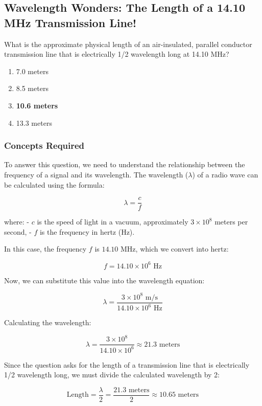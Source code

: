 \subsection{Wavelength Wonders: The Length of a 14.10 MHz Transmission Line!}

\begin{tcolorbox}[colback=gray!10, colframe=black, title=E9F06] What is the approximate physical length of an air-insulated, parallel conductor transmission line that is electrically 1/2 wavelength long at 14.10 MHz?

\begin{enumerate}[label=\Alph*.]
    \item 7.0 meters
    \item 8.5 meters
    \item \textbf{10.6 meters}
    \item 13.3 meters
\end{enumerate} \end{tcolorbox}

\subsubsection{Concepts Required}

To answer this question, we need to understand the relationship between the frequency of a signal and its wavelength. The wavelength (\(\lambda\)) of a radio wave can be calculated using the formula:

\[
\lambda = \frac{c}{f}
\]

where:
- \(c\) is the speed of light in a vacuum, approximately \(3 \times 10^8\) meters per second,
- \(f\) is the frequency in hertz (Hz).

In this case, the frequency \(f\) is \(14.10\) MHz, which we convert into hertz:

\[
f = 14.10 \times 10^6 \text{ Hz}
\]

Now, we can substitute this value into the wavelength equation:

\[
\lambda = \frac{3 \times 10^8 \text{ m/s}}{14.10 \times 10^6 \text{ Hz}}
\]

Calculating the wavelength:

\[
\lambda = \frac{3 \times 10^8}{14.10 \times 10^6} \approx 21.3 \text{ meters}
\]

Since the question asks for the length of a transmission line that is electrically 1/2 wavelength long, we must divide the calculated wavelength by 2:

\[
\text{Length} = \frac{\lambda}{2} = \frac{21.3 \text{ meters}}{2} \approx 10.65 \text{ meters}
\]


